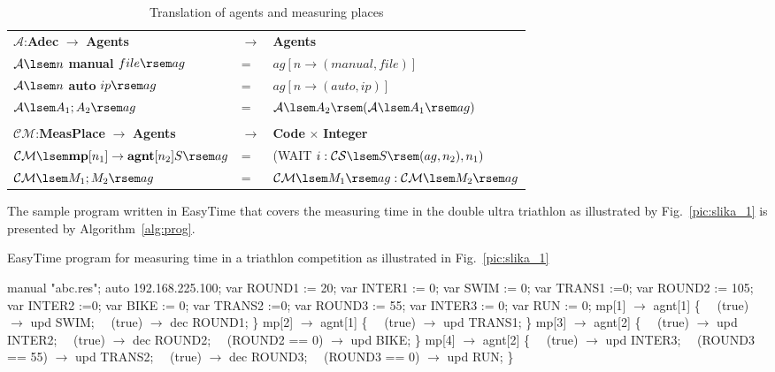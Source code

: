 \documentclass[preprint, prX]{revtex4}
\begin{document}
\begin{table}[htb]
\caption{Translation of agents and measuring places}
\label{tab:tab6}
\vspace{-5mm}
\begin{center}
\begin{tabular}{ | l  l  l | }
\hline
  $\mathcal{A}$:\textbf{Adec} $\rightarrow$ \textbf{Agents} & $\rightarrow$ & \textbf{Agents} \\
  $\mathcal{A} \lsem n$ \textbf{manual} $ file\rsem ag$ & = & $ag [ n \rightarrow (manual, file) ]$ \\
  $\mathcal{A} \lsem n$ \textbf{auto} $ ip\rsem ag$ & = & $ag [ n \rightarrow (auto, ip) ]$ \\
  $\mathcal{A} \lsem A_{1};A_{2}\rsem ag$ & = & $\mathcal{A} \lsem A_{2} \rsem (\mathcal{A} \lsem A_{1} \rsem ag)$ \\
  & & \\
  $\mathcal{CM}$:\textbf{MeasPlace} $\rightarrow$ \textbf{Agents}&$\rightarrow$&\textbf{Code} $\times$ \textbf{Integer} \\
  $\mathcal{CM} \lsem \textbf{mp}[n_{1}] \rightarrow \textbf{agnt}[n_{2}] S \rsem ag$&=&(WAIT $i:\mathcal{CS} \lsem S \rsem (ag, n_{2}),
  n_{1} )$  \\
  $\mathcal{CM} \lsem M_{1}; M_{2} \rsem ag$&=&$\mathcal{CM} \lsem M_{1} \rsem ag: \mathcal{CM} \lsem M_{2} \rsem ag$ \\
\hline
\end{tabular}
\end{center}
\vspace{-5mm}
\end{table}

The sample program written in EasyTime that covers the measuring time in the double ultra triathlon as illustrated by
Fig.~\ref{pic:slika_1} is presented by Algorithm~\ref{alg:prog}.

\begin{algorithm}[htb]
\caption{EasyTime program for measuring time in a triathlon competition as illustrated in Fig.~\ref{pic:slika_1}}
\label{alg:prog}
\small
\begin{algorithmic}[1]
 manual "abc.res";
 auto 192.168.225.100;
\STATE
\STATE var ROUND1 := 20;
\STATE var INTER1 := 0;
\STATE var SWIM := 0;
\STATE var TRANS1 :=0;
\STATE var ROUND2 := 105;
\STATE var INTER2 :=0;
\STATE var BIKE := 0;
\STATE var TRANS2 :=0;
\STATE var ROUND3 := 55;
\STATE var INTER3 := 0;
\STATE var RUN := 0;
\STATE
\STATE mp[1] $\rightarrow$ agnt[1] \{
\STATE \ \ (true) $\rightarrow$ upd SWIM;
\STATE \ \ (true) $\rightarrow$ dec ROUND1;
\STATE \}
\STATE mp[2] $\rightarrow$ agnt[1] \{
\STATE \ \ (true) $\rightarrow$  upd TRANS1;
\STATE \}
\STATE mp[3] $\rightarrow$  agnt[2] \{
\STATE \ \ (true) $\rightarrow$  upd INTER2;
\STATE \ \ (true) $\rightarrow$  dec ROUND2;
\STATE \ \ (ROUND2 == 0) $\rightarrow$  upd BIKE;
\STATE \}
\STATE mp[4] $\rightarrow$  agnt[2] \{
\STATE \ \ (true) $\rightarrow$  upd INTER3;
\STATE \ \ (ROUND3 == 55) $\rightarrow$  upd TRANS2;
\STATE \ \ (true) $\rightarrow$  dec ROUND3;
\STATE \ \ (ROUND3 == 0) $\rightarrow$  upd RUN;
\STATE \}
\end{algorithmic}
\normalsize
\end{algorithm}
\end{document}
